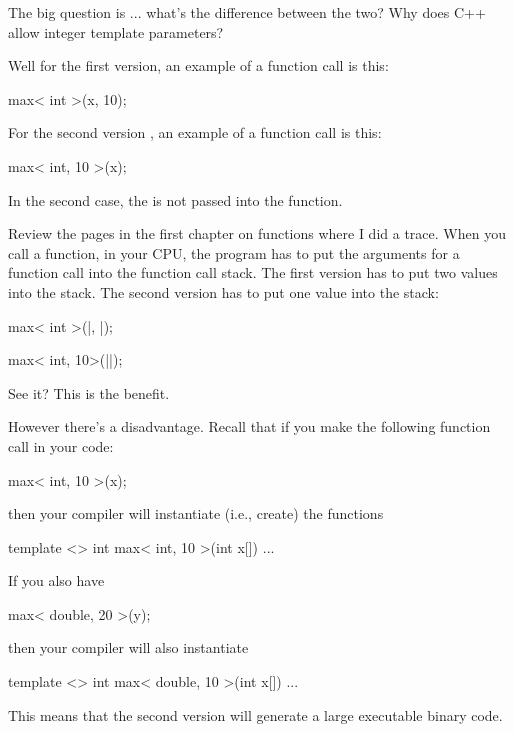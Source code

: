 The big question is ... what's the difference between the two? Why
does C++ allow integer template parameters?

Well for the first version, an example of a function call is this:
\begin{console}
max< int >(x, 10);
\end{console}
For the second version , an example of a function call is this:

\begin{console}
max< int, 10 >(x);
\end{console}

In the second case, the  is not passed into the function.

Review the  pages in the first chapter on
functions where I did a trace. When you call a function, in your CPU,
the program has to put the arguments for a function call into the
function call stack. The first version has to put two values into the
stack. The second version has to put one value into the stack:

\begin{consolethree}[escapeinside=||]
max< int >(|, |);
\end{consolethree}

\begin{consolethree}[escapeinside=||]
max< int, 10>(||);
\end{consolethree}

See it? This is the benefit.

However there's a disadvantage. Recall that if you make the following
function call in your code:

\begin{console}
max< int, 10 >(x);
\end{console}

then your compiler will instantiate (i.e., create) the functions

\begin{consolethree}[escapeinside=||]
template <>
int max< int, 10 >(int x[])
{
    ...
}
\end{consolethree}

If you also have

\begin{console}
max< double, 20 >(y);
\end{console}

then your compiler will also instantiate

\begin{consolethree}[escapeinside=||]
template <>
int max< double, 10 >(int x[])
{
    ...
}
\end{consolethree}

This means that the second version will generate a large executable
binary code.





